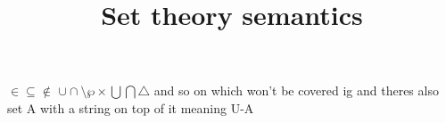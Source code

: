 \documentclass{article}
\title{Set theory semantics}
\theoremstyle{definition}
\begin{document}
    \maketitle
    $\in \subseteq \notin$ 
$\cup \cap \setminus \wp \times \bigcup \bigcap \triangle $ and so on which won't be covered ig and theres also set A with a string on top of it meaning U-A
\end{document}
